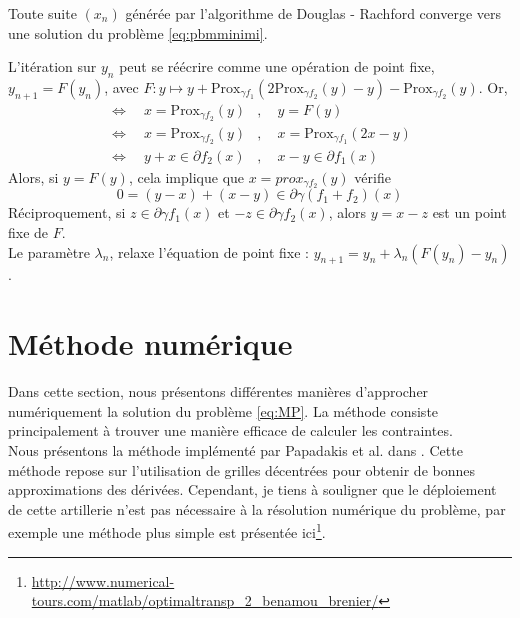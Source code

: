 \documentclass[a4paper,12pt]{article}
\newcommand{\prox}{\text{Prox}}
\begin{document}
\begin{propriete}
Toute suite $(x_n)$ générée par l'algorithme de Douglas - Rachford converge vers une solution du problème \ref{eq:pbmminimi}.
\end{propriete}

\begin{preuve}
L'itération sur $y_n$ peut se réécrire comme une opération de point fixe, $y_{n+1}=F(y_n)$, avec $F:y\mapsto y+\prox_{\gamma f_1}(2\prox_{\gamma f_2}(y)-y)-\prox_{\gamma f_2}(y)$. Or, 
\begin{align*}
\Longleftrightarrow\quad x=\prox_{\gamma f_2}(y) &,\quad y = F(y) \\
\Longleftrightarrow\quad x=\prox_{\gamma f_2}(y) &,\quad x = \prox_{\gamma f_1}(2x-y) \\
\Longleftrightarrow\quad y+x\in\partial f_2(x)   &, \quad x-y\in\partial f_1(x)
\end{align*}
Alors, si $y=F(y)$, cela implique que $x=prox_{\gamma f_2}(y)$ vérifie 
$$
0=(y-x)+(x-y)\in \partial\gamma(f_1+f_2)(x)
$$
Réciproquement, si $z\in\partial \gamma f_1(x)$ et $-z\in\partial \gamma f_2(x)$, alors $y=x-z$ est un point fixe de $F$.\\

Le paramètre $\lambda_n$, relaxe l'équation de point fixe : $y_{n+1}=y_n + \lambda_n(F(y_n)-y_n)$. 
\end{preuve}






\newpage

\section{Méthode numérique}
\label{sec:numerique}
Dans cette section, nous présentons différentes manières d'approcher numériquement la solution du problème \eqref{eq:MP}. La méthode consiste principalement à trouver une manière efficace de calculer les contraintes. \\

Nous présentons la méthode implémenté par Papadakis et al. dans \cite{papadakis}. Cette méthode repose sur l'utilisation de grilles décentrées pour obtenir de bonnes approximations des dérivées. Cependant, je tiens à souligner que le déploiement de cette artillerie n'est pas nécessaire à la résolution numérique du problème, par exemple une méthode plus simple est présentée ici\footnote{\url{http://www.numerical-tours.com/matlab/optimaltransp\_2\_benamou\_brenier/}}.\\
\end{document}
